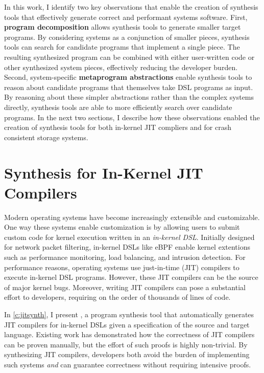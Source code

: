 In this work, I identify two key observations that enable the creation of synthesis tools
that effectively generate correct and performant systems software.
First, \textbf{program decomposition} allows synthesis tools to generate smaller target programs.
By considering systems as a conjunction of smaller pieces,
synthesis tools can search for candidate programs that implement a single piece.
The resulting synthesized program can be combined with either user-written code or
other synthesized system pieces, effectively reducing the developer burden.
Second, system-specific \textbf{metaprogram abstractions} enable synthesis tools to reason 
about candidate programs that themselves take DSL programs as input.
By reasoning about these simpler abstractions rather than the complex systems directly,
synthesis tools are able to more efficiently search over candidate programs.
In the next two sections, I describe how these observations enabled the creation of
synthesis tools for both in-kernel JIT compliers and for crash consistent storage systems.



\section{Synthesis for In-Kernel JIT Compilers}
Modern operating systems have become increasingly extensible and customizable.
One way these systems enable customization is by
allowing users to submit custom code for kernel execution
written in an \textit{in-kernel DSL}.
Initially designed for network packet filtering, 
in-kernel DSLs like eBPF  enable kernel extentions
such as performance monitoring, load balancing, and intrusion detection.
For performance reasons, operating systems use just-in-time (JIT) compilers
to execute in-kernel DSL programs.
However,
these JIT compilers can be the source of major kernel bugs.
Moreover, writing JIT compilers can pose a substantial effort to developers,
requiring on the order of thousands of lines of code.

In \cref{c:jitsynth}, I present \jitsynth, a program synthesis tool that
automatically generates JIT compilers for in-kernel DSLs
given a specification of the source and target language.
Existing work has demonstrated how the correctness of JIT compilers
can be proven manually,
but the effort of such proofs is highly non-trivial.
By synthesizing JIT compilers, developers both avoid the burden of implementing
such systems \textit{and} can guarantee correctness
without requiring intensive proofs.

